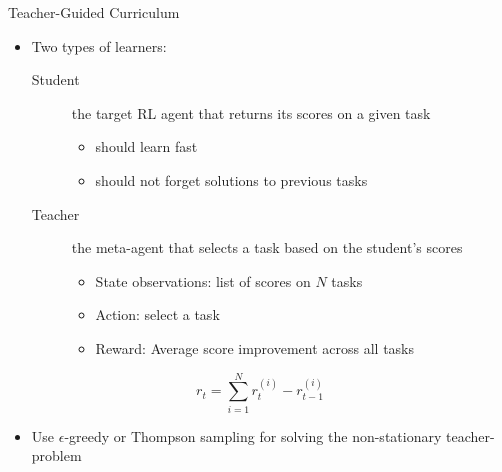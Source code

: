 \begin{frame}[c]{Teacher-Guided Curriculum }
	
	\begin{itemize}
		\item Two types of learners:
		\begin{description}
			\item[Student] the target RL agent that returns its scores on a given task
			\begin{itemize}
				\item should learn fast
				\item should not forget solutions to previous tasks
			\end{itemize}
			\item[Teacher] the meta-agent that selects a task based on the student's scores
			\begin{itemize}
				\item State observations: list of scores on $N$ tasks
				\item Action: select a task
				\item Reward: Average score improvement across all tasks
			\end{itemize}
		\end{description}
	\end{itemize}

	$$r_t = \sum_{i=1}^N r_t^{(i)} - r_{t-1}^{(i)}$$	
	
	\pause
	\begin{itemize}
		\item Use $\epsilon$-greedy or Thompson sampling for solving the non-stationary teacher-problem
	\end{itemize}
	
\end{frame}
